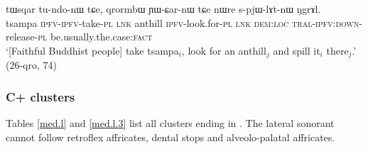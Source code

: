 \begin{exe}
	\ex \label{ex:spjWlAtnW}
	\gll tɯsqar tu-ndo-nɯ tɕe, qrormbɯ ɲɯ-ɕar-nɯ tɕe nɯre s-pjɯ-lɤt-nɯ ŋgrɤl. \\
	tsampa \textsc{ipfv}-\textsc{ipfv}-take-\textsc{pl} \textsc{lnk} anthill \textsc{ipfv}-look.for-\textsc{pl} \textsc{lnk} \textsc{dem}:\textsc{loc} \textsc{tral}-\textsc{ipfv}:\textsc{down}-release-\textsc{pl} be.usually.the.case:\textsc{fact} \\
	\glt `[Faithful Buddhist people] take tsampa$_i$, look for an anthill$_j$ and spill it$_i$ there$_j$.' (26-qro, 74)
\end{exe}

\subsubsection{C+ clusters} \label{sec:Cl.clusters}
Tables \ref{med.l} and \ref{med.l.3} list all clusters ending in . The lateral sonorant cannot follow retroflex affricates, dental stops and alveolo-palatal affricates.

